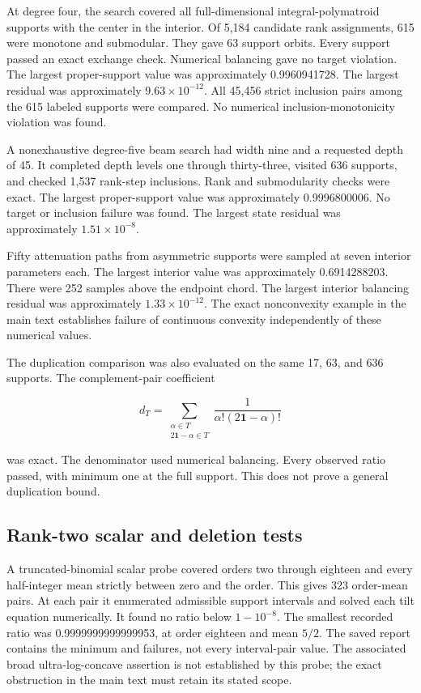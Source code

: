 At degree four, the search covered all full-dimensional integral-polymatroid supports with the center in the interior. Of 5,184 candidate rank assignments, 615 were monotone and submodular. They gave 63 support orbits. Every support passed an exact exchange check. Numerical balancing gave no target violation. The largest proper-support value was approximately 0.9960941728. The largest residual was approximately \(9.63\times10^{-12}\). All 45,456 strict inclusion pairs among the 615 labeled supports were compared. No numerical inclusion-monotonicity violation was found.

A nonexhaustive degree-five beam search had width nine and a requested depth of 45. It completed depth levels one through thirty-three, visited 636 supports, and checked 1,537 rank-step inclusions. Rank and submodularity checks were exact. The largest proper-support value was approximately 0.9996800006. No target or inclusion failure was found. The largest state residual was approximately \(1.51\times10^{-8}\).

Fifty attenuation paths from asymmetric supports were sampled at seven interior parameters each. The largest interior value was approximately 0.6914288203. There were 252 samples above the endpoint chord. The largest interior balancing residual was approximately \(1.33\times10^{-12}\). The exact nonconvexity example in the main text establishes failure of continuous convexity independently of these numerical values.

The duplication comparison was also evaluated on the same 17, 63, and 636 supports. The complement-pair coefficient

\[
d_T=\sum_{\substack{\alpha\in T\\2\mathbf1-\alpha\in T}}
\frac1{\alpha!(2\mathbf1-\alpha)!}
\]

was exact. The denominator used numerical balancing. Every observed ratio passed, with minimum one at the full support. This does not prove a general duplication bound.

\subsection{Rank-two scalar and deletion tests}\label{app:finite-11}

A truncated-binomial scalar probe covered orders two through eighteen and every half-integer mean strictly between zero and the order. This gives 323 order-mean pairs. At each pair it enumerated admissible support intervals and solved each tilt equation numerically. It found no ratio below \(1-10^{-8}\). The smallest recorded ratio was 0.9999999999999953, at order eighteen and mean \(5/2\). The saved report contains the minimum and failures, not every interval-pair value. The associated broad ultra-log-concave assertion is not established by this probe; the exact obstruction in the main text must retain its stated scope.

